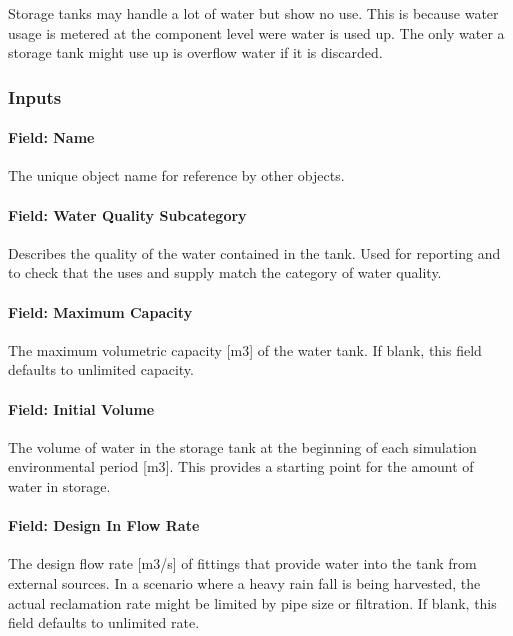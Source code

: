 Storage tanks may handle a lot of water but show no use. This is because water usage is metered at the component level were water is used up. The only water a storage tank might use up is overflow water if it is discarded.

\subsubsection{Inputs}\label{inputs-2-046}

\paragraph{Field: Name}\label{field-name-2-043}

The unique object name for reference by other objects.

\paragraph{Field: Water Quality Subcategory}\label{field-water-quality-subcategory}

Describes the quality of the water contained in the tank. Used for reporting and to check that the uses and supply match the category of water quality.

\paragraph{Field: Maximum Capacity}\label{field-maximum-capacity}

The maximum volumetric capacity {[}m3{]} of the water tank. If blank, this field defaults to unlimited capacity.

\paragraph{Field: Initial Volume}\label{field-initial-volume}

The volume of water in the storage tank at the beginning of each simulation environmental period {[}m3{]}. This provides a starting point for the amount of water in storage.

\paragraph{Field: Design In Flow Rate}\label{field-design-in-flow-rate}

The design flow rate {[}m3/s{]} of fittings that provide water into the tank from external sources. In a scenario where a heavy rain fall is being harvested, the actual reclamation rate might be limited by pipe size or filtration. If blank, this field defaults to unlimited rate.


